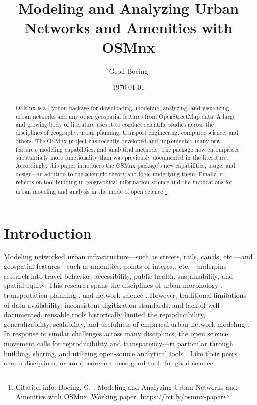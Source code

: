 \documentclass[12pt,letterpaper]{article} %
\makeatletter
\newcommand{\myname}{Geoff Boeing}
\newcommand{\myemail}{boeing@usc.edu}
\newcommand{\myaffiliation}{University of Southern California}
\newcommand{\paperdate}{\monthyeardate\today}
\newcommand{\papertitle}{Modeling and Analyzing Urban Networks and Amenities with OSMnx}
\newcommand{\papercitation}{Boeing, G. \the\year. \papertitle. Working paper. \href{https://bit.ly/osmnx-paper}{https://bit.ly/osmnx-paper}}
\makeatother
\begin{document}
\title{\papertitle}
\author[]{\myname}
\affil[]{\myaffiliation}
\date{\paperdate}

\maketitle

\begin{abstract}

OSMnx is a Python package for downloading, modeling, analyzing, and visualizing urban networks and any other geospatial features from OpenStreetMap data. A large and growing body of literature uses it to conduct scientific studies across the disciplines of geography, urban planning, transport engineering, computer science, and others. The OSMnx project has recently developed and implemented many new features, modeling capabilities, and analytical methods. The package now encompasses substantially more functionality than was previously documented in the literature. Accordingly, this paper introduces the OSMnx package's new capabilities, usage, and design---in addition to the scientific theory and logic underlying them. Finally, it reflects on tool building in geographical information science and the implications for urban modeling and analysis in the mode of open science.\footnote{Citation info: \papercitation}%

\end{abstract}

\section{Introduction}

Modeling networked urban infrastructure---such as streets, rails, canals, etc.---and geospatial features---such as amenities, points of interest, etc.---underpins research into travel behavior, accessibility, public health, sustainability, and spatial equity. This research spans the disciplines of urban morphology \citep[e.g.,][]{gervasoni_calculating_2017,dacci_signature_2019,coutrot_entropy_2022}, transportation planning \citep[e.g.,][]{merchan_quantifying_2020,liao_disparities_2020,natera_orozco_data-driven_2020}, and network science \citep[e.g.,][]{feng_spatial_2020,yin_multi-task_2020,young_automatic_2020}. However, traditional limitations of data availability, inconsistent digitization standards, and lack of well-documented, reusable tools historically limited the reproducibility, generalizability, scalability, and usefulness of empirical urban network modeling \citep{liu_generalized_2022}. In response to similar challenges across many disciplines, the open science movement calls for reproducibility and transparency---in particular through building, sharing, and utilizing open-source analytical tools \citep{rey_show_2009,singleton_establishing_2016,rey_pysal:_2019,kedron_reproducibility_2021}. Like their peers across disciplines, urban researchers need good tools for good science.
\end{document}
